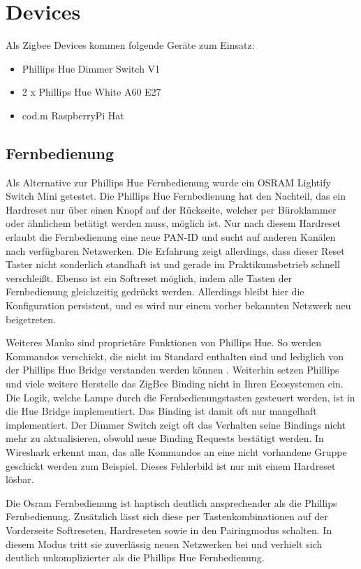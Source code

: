 \section{Devices}

Als Zigbee Devices kommen folgende Geräte zum Einsatz:

\begin{itemize}
  \item Phillips Hue Dimmer Switch V1
  \item 2 x Phillips Hue White A60 E27
  \item cod.m RaspberryPi Hat
\end{itemize}

\subsection{Fernbedienung}
Als Alternative zur Phillips Hue Fernbedienung wurde ein OSRAM Lightify Switch Mini getestet. Die Phillips Hue Fernbedienung hat den Nachteil,
das ein Hardreset nur über einen Knopf auf der Rückseite, welcher per Büroklammer oder ähnlichem betätigt werden muss, möglich ist. Nur nach diesem 
Hardreset erlaubt die Fernbedienung eine neue PAN-ID und sucht auf anderen Kanälen nach verfügbaren Netzwerken. Die Erfahrung zeigt allerdings,
dass dieser Reset Taster nicht sonderlich standhaft ist und gerade im Praktikumsbetrieb schnell verschleißt. Ebenso ist ein Softreset möglich,
indem alle Tasten der Fernbedienung gleichzeitig gedrückt werden. Allerdings bleibt hier die Konfiguration persistent, und es wird nur einem 
vorher bekannten Netzwerk neu beigetreten. 

Weiteres Manko sind proprietäre Funktionen von Phillips Hue. So werden Kommandos verschickt, die nicht im Standard enthalten sind und lediglich von der Phillips Hue Bridge verstanden 
werden können \cite{koe}. Weiterhin setzen Phillips und viele weitere Herstelle das ZigBee Binding nicht in Ihren Ecosystemen ein. Die Logik, welche Lampe durch 
die Fernbedienungstasten gesteuert werden, ist in die Hue Bridge implementiert. Das Binding ist damit oft nur mangelhaft implementiert. Der Dimmer Switch 
zeigt oft das Verhalten seine Bindings nicht mehr zu aktualisieren, obwohl neue Binding Requests bestätigt werden. In Wireshark erkennt man, das alle Kommandos
an eine nicht vorhandene Gruppe geschickt werden zum Beispiel. Dieses Fehlerbild ist nur mit einem Hardreset lösbar. 

Die Osram Fernbedienung ist haptisch deutlich ansprechender als die Phillips Fernbedienung. Zusätzlich lässt sich diese per Tastenkombinationen auf der 
Vorderseite Softreseten, Hardreseten sowie in den Pairingmodus schalten. In diesem Modus tritt sie zuverlässig neuen Netzwerken bei und verhielt sich 
deutlich unkomplizierter als die Phillips Hue Fernbedienung. 

